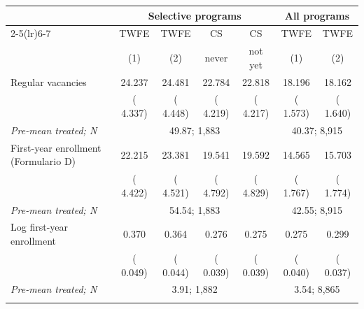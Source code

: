 \begin{tabular}{lcccccc}
\toprule
 & \multicolumn{4}{c}{Selective programs} & \multicolumn{2}{c}{All programs} \\
\cmidrule(lr){2-5}\cmidrule(lr){6-7}
 & TWFE & TWFE & CS & CS & TWFE & TWFE \\
 & (1) & (2) & never & not yet & (1) & (2) \\
\midrule
Regular vacancies &  24.237\sym{***} &  24.481\sym{***} &  22.784\sym{***} &  22.818\sym{***} &  18.196\sym{***} &  18.162\sym{***} \\
 & ( 4.337) & ( 4.448) & ( 4.219) & ( 4.217) & ( 1.573) & ( 1.640) \\
\quad \textit{Pre-mean treated; N} & \multicolumn{4}{c}{\scriptsize  49.87; 1,883} & \multicolumn{2}{c}{\scriptsize  40.37; 8,915} \\
\addlinespace
First-year enrollment (Formulario D) &  22.215\sym{***} &  23.381\sym{***} &  19.541\sym{***} &  19.592\sym{***} &  14.565\sym{***} &  15.703\sym{***} \\
 & ( 4.422) & ( 4.521) & ( 4.792) & ( 4.829) & ( 1.767) & ( 1.774) \\
\quad \textit{Pre-mean treated; N} & \multicolumn{4}{c}{\scriptsize  54.54; 1,883} & \multicolumn{2}{c}{\scriptsize  42.55; 8,915} \\
\addlinespace
Log first-year enrollment &   0.370\sym{***} &   0.364\sym{***} &   0.276\sym{***} &   0.275\sym{***} &   0.275\sym{***} &   0.299\sym{***} \\
 & ( 0.049) & ( 0.044) & ( 0.039) & ( 0.039) & ( 0.040) & ( 0.037) \\
\quad \textit{Pre-mean treated; N} & \multicolumn{4}{c}{\scriptsize   3.91; 1,882} & \multicolumn{2}{c}{\scriptsize   3.54; 8,865} \\
\addlinespace
\bottomrule
\end{tabular}
